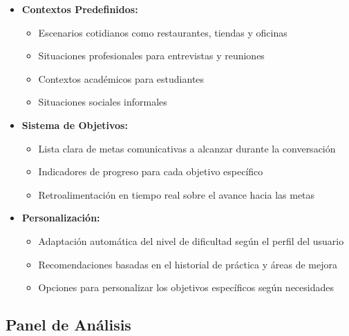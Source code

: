 \begin{itemize}
    \item \textbf{Contextos Predefinidos:}
    \begin{itemize}
        \item Escenarios cotidianos como restaurantes, tiendas y oficinas
        \item Situaciones profesionales para entrevistas y reuniones
        \item Contextos académicos para estudiantes
        \item Situaciones sociales informales
    \end{itemize}
    
    \item \textbf{Sistema de Objetivos:}
    \begin{itemize}
        \item Lista clara de metas comunicativas a alcanzar durante la conversación
        \item Indicadores de progreso para cada objetivo específico
        \item Retroalimentación en tiempo real sobre el avance hacia las metas
    \end{itemize}
    
    \item \textbf{Personalización:}
    \begin{itemize}
        \item Adaptación automática del nivel de dificultad según el perfil del usuario
        \item Recomendaciones basadas en el historial de práctica y áreas de mejora
        \item Opciones para personalizar los objetivos específicos según necesidades
    \end{itemize}
\end{itemize}

\subsection{Panel de Análisis}
\label{panel-analisis}

